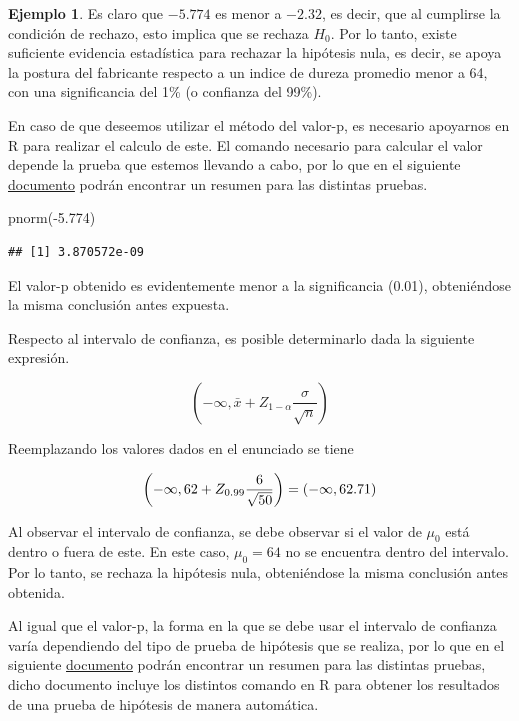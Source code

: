 \documentclass[
]{book}
\newenvironment{Shaded}{\begin{snugshade}}{\end{snugshade}}
\newcommand{\FloatTok}[1]{\textcolor[rgb]{0.00,0.00,0.81}{#1}}
\newcommand{\FunctionTok}[1]{\textcolor[rgb]{0.00,0.00,0.00}{#1}}
\newcommand{\NormalTok}[1]{#1}
\newcommand{\SpecialCharTok}[1]{\textcolor[rgb]{0.00,0.00,0.00}{#1}}
\theoremstyle{definition}
\theoremstyle{definition}
\newtheorem{example}{Ejemplo}[chapter]
\theoremstyle{definition}
\theoremstyle{definition}
\theoremstyle{remark}
\begin{document}
\begin{example}
Es claro que \(-5.774\) es menor a \(-2.32\), es decir, que al cumplirse la condición de rechazo, esto implica que se rechaza \(H_0\). Por lo tanto, existe suficiente evidencia estadística para rechazar la hipótesis nula, es decir, se apoya la postura del fabricante respecto a un indice de dureza promedio menor a 64, con una significancia del 1\% (o confianza del 99\%).

En caso de que deseemos utilizar el método del valor-p, es necesario apoyarnos en R para realizar el calculo de este. El comando necesario para calcular el valor depende la prueba que estemos llevando a cabo, por lo que en el siguiente \href{https://github.com/Dfranzani/Estadistica_II_UDP/blob/main/resumenes/Rechazo.pdf}{documento} podrán encontrar un resumen para las distintas pruebas.

\begin{Shaded}
\begin{Highlighting}[]
\FunctionTok{pnorm}\NormalTok{(}\SpecialCharTok{{-}}\FloatTok{5.774}\NormalTok{)}
\end{Highlighting}
\end{Shaded}

\begin{verbatim}
## [1] 3.870572e-09
\end{verbatim}

El valor-p obtenido es evidentemente menor a la significancia (0.01), obteniéndose la misma conclusión antes expuesta.

Respecto al intervalo de confianza, es posible determinarlo dada la siguiente expresión.

\begin{equation}
\left(-\infty, \bar{x} + Z_{1-\alpha}\frac{\sigma}{\sqrt{n}}\right)
\end{equation}

Reemplazando los valores dados en el enunciado se tiene

\begin{equation}
\notag
\left(-\infty, 62 + Z_{0.99}\frac{6}{\sqrt{50}}\right) = (-\infty, 62.71)
\end{equation}

Al observar el intervalo de confianza, se debe observar si el valor de \(\mu_0\) está dentro o fuera de este. En este caso, \(\mu_0 = 64\) no se encuentra dentro del intervalo. Por lo tanto, se rechaza la hipótesis nula, obteniéndose la misma conclusión antes obtenida.

Al igual que el valor-p, la forma en la que se debe usar el intervalo de confianza varía dependiendo del tipo de prueba de hipótesis que se realiza, por lo que en el siguiente \href{https://github.com/Dfranzani/Estadistica_II_UDP/blob/main/resumenes/Resumen\%20de\%20intervalos\%20de\%20Hip\%C3\%B3tesis\%20e\%20IC.pdf}{documento} podrán encontrar un resumen para las distintas pruebas, dicho documento incluye los distintos comando en R para obtener los resultados de una prueba de hipótesis de manera automática.
\end{example}
\end{document}
